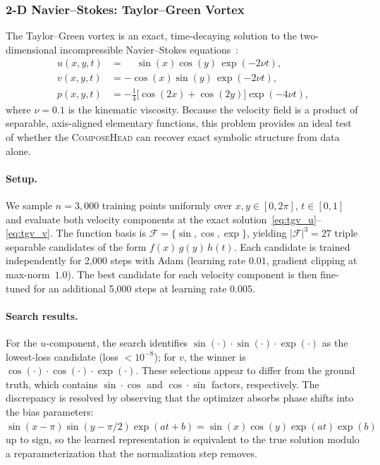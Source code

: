 \subsubsection{2-D Navier--Stokes: Taylor--Green Vortex}
\label{sec:tgv}

The Taylor--Green vortex is an exact, time-decaying solution to the
two-dimensional incompressible Navier--Stokes equations~\citep{taylor1937}:
\begin{align}
  u(x,y,t) &= \phantom{-}\sin(x)\cos(y)\,\exp(-2\nu t), \label{eq:tgv_u}\\
  v(x,y,t) &= -\cos(x)\sin(y)\,\exp(-2\nu t), \label{eq:tgv_v}\\
  p(x,y,t) &= -\tfrac{1}{4}\bigl[\cos(2x)+\cos(2y)\bigr]\exp(-4\nu t),
              \label{eq:tgv_p}
\end{align}
where $\nu=0.1$ is the kinematic viscosity.  Because the velocity field is a
product of separable, axis-aligned elementary functions, this problem provides
an ideal test of whether the \textsc{ComposeHead} can recover exact symbolic
structure from data alone.

\paragraph{Setup.}
We sample $n=3{,}000$ training points uniformly over
$x,y\in[0,2\pi]$, $t\in[0,1]$ and evaluate both velocity components at the
exact solution~\eqref{eq:tgv_u}--\eqref{eq:tgv_v}.  The function basis is
$\mathcal{F}=\{\sin,\cos,\exp\}$, yielding $|\mathcal{F}|^3=27$ triple
separable candidates of the form $f(x)\,g(y)\,h(t)$.  Each candidate is
trained independently for 2{,}000 steps with Adam (learning rate $0.01$,
gradient clipping at max-norm~$1.0$).  The best candidate for each velocity
component is then fine-tuned for an additional 5{,}000 steps at learning rate
$0.005$.

\paragraph{Search results.}
For the $u$-component, the search identifies
$\sin(\cdot)\!\cdot\!\sin(\cdot)\!\cdot\!\exp(\cdot)$ as the lowest-loss
candidate (loss $<10^{-8}$); for $v$, the winner is
$\cos(\cdot)\!\cdot\!\cos(\cdot)\!\cdot\!\exp(\cdot)$.  These selections appear
to differ from the ground truth, which contains $\sin\!\cdot\!\cos$ and
$\cos\!\cdot\!\sin$ factors, respectively.  The discrepancy is resolved by
observing that the optimizer absorbs phase shifts into the bias parameters:
$\sin(x - \pi)\sin(y - \pi/2)\exp(at+b) = \sin(x)\cos(y)\exp(at)\exp(b)$
up to sign, so the learned representation is equivalent to the true solution
modulo a reparameterization that the normalization step removes.

